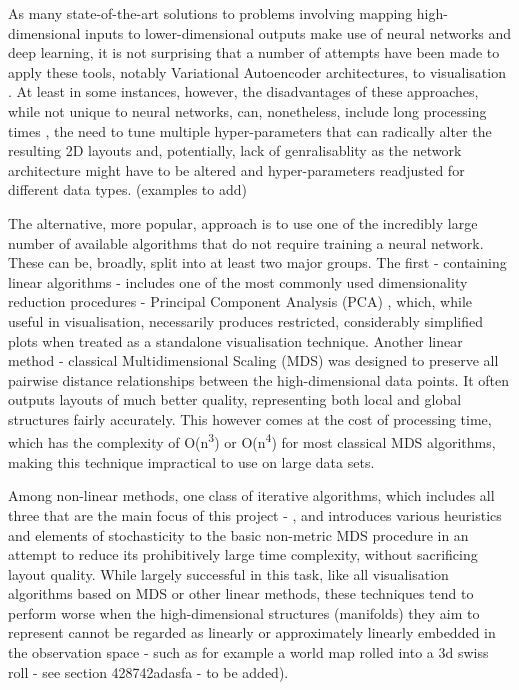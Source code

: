 \documentclass{l4proj}
\begin{document}
As many state-of-the-art solutions to problems involving mapping high-dimensional inputs to lower-dimensional outputs make use of neural networks and deep learning, it is not surprising that a number of attempts have been made to apply these tools, notably Variational Autoencoder architectures, to visualisation \citep{ nn_vis1, nn_vis2, nn_vis3, nn_vis4, nn_vis5, nn_vis6, nn_vis7}. At least in some instances, however, the disadvantages of these approaches, while not unique to neural networks, can, nonetheless, include long processing times \citep{nn_vis5}, the need to tune multiple hyper-parameters that can radically alter the resulting 2D layouts \citep{nn_vis5, nn_vis6} and, potentially, lack of genralisablity as the network architecture might have to be altered and hyper-parameters readjusted for different data types. (examples to add)

The alternative, more popular, approach is to use one of the incredibly large number of available algorithms that do not require training a neural network. These can be, broadly, split into at least two major groups. The first - containing linear algorithms - includes one of the most commonly used dimensionality reduction procedures  - Principal Component Analysis (PCA) \citep{pca}, which, while useful in visualisation, necessarily produces restricted, considerably simplified plots when treated as a standalone visualisation technique. Another linear method - classical Multidimensional Scaling (MDS) \citep{mds} was designed to preserve all pairwise distance relationships between the high-dimensional data points. It often outputs layouts of much better quality, representing both local and global structures fairly accurately. This however comes at the cost of processing time, which has the complexity of O(n\textsuperscript{3}) or O(n\textsuperscript{4}) for most classical MDS algorithms, making this technique impractical to use on large data sets.

Among non-linear methods, one class of iterative algorithms, which includes all three that are the main focus of this project - \citet{Chalmers96}, \citet{hyrid} and \citet{squad} introduces various heuristics and elements of stochasticity to the basic non-metric MDS procedure in an attempt to reduce its prohibitively large time complexity, without sacrificing layout quality. While largely successful in this task, like all visualisation algorithms based on MDS or other linear methods, these techniques tend to perform worse when the high-dimensional structures (manifolds) they aim to represent cannot be regarded as linearly or approximately linearly embedded in the observation space \citep{swissroll} - such as for example a world map rolled into a 3d swiss roll - see section 428742adasfa - to be added).  
\end{document}
